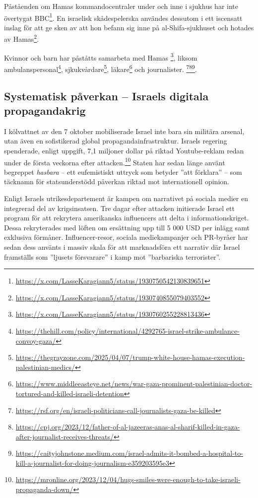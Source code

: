 \documentclass[12pt]{article}
\begin{document}
Påståenden om Hamas kommandocentraler under och inne i sjukhus har inte övertygat BBC\footnote{\url{https://x.com/LasseKaragiann5/status/1930750542130839651}}. En israelisk skådespelerska användes dessutom i ett iscensatt inslag för att ge sken av att hon befann sig inne på al-Shifa-sjukhuset och hotades av Hamas\footnote{\url{https://x.com/LasseKaragiann5/status/1930740855079403552}}.

Kvinnor och barn har påståtts samarbeta med Hamas \footnote{\url{https://x.com/LasseKaragiann5/status/1930760255228813436}}, liksom ambulanspersonal\footnote{\url{https://thehill.com/policy/international/4292765-israel-strike-ambulance-convoy-gaza/}}, sjkukvårdare\footnote{\url{https://thegrayzone.com/2025/04/07/trump-white-house-hamas-execution-palestinian-medics/}}, läkare\footnote{\url{https://www.middleeasteye.net/news/war-gaza-prominent-palestinian-doctor-tortured-and-killed-israeli-detention}} och journalister.
\footnote{\url{https://rsf.org/en/israeli-politicians-call-journalists-gaza-be-killed}}\footnote{\url{https://cpj.org/2023/12/father-of-al-jazeeras-anas-al-sharif-killed-in-gaza-after-journalist-receives-threats/}}\footnote{\url{https://caityjohnstone.medium.com/israel-admits-it-bombed-a-hospital-to-kill-a-journalist-for-doing-journalism-e359203595e3}}. 



\subsection{Systematisk påverkan – Israels digitala propagandakrig}

I kölvattnet av den 7 oktober mobiliserade Israel inte bara sin militära arsenal, utan även en sofistikerad global propagandainfrastruktur. Israels regering spenderade, enligt uppgift, 7,1 miljoner dollar på riktad Youtube-reklam redan under de första veckorna efter attacken.\footnote{\url{https://mronline.org/2023/12/04/hugs-smiles-were-enough-to-take-israeli-propaganda-down/}} Staten har sedan länge använt begreppet \textit{hasbara} – ett eufemistiskt uttryck som betyder ”att förklara” – som täcknamn för statsunderstödd påverkan riktad mot internationell opinion.

Enligt Israels utrikesdepartement är kampen om narrativet på sociala medier en integrerad del av krigsinsatsen. Tre dagar efter attacken initierade Israel ett program för att rekrytera amerikanska influencers att delta i informationskriget. Dessa rekryterades med löften om ersättning upp till 5 000 USD per inlägg samt exklusiva förmåner. Influencer-resor, sociala mediekampanjer och PR-byråer har sedan dess använts i massiv skala för att marknadsföra ett narrativ där Israel framställs som ”ljusets försvarare” i kamp mot ”barbariska terrorister”.
\end{document}
